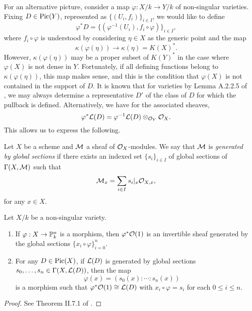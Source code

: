 For an alternative picture, consider a map $\varphi : X/k \to Y/k$ of non-singular varieties.
Fixing $D \in {\rm Pic}(Y)$, represented as $\{(U_i, f_i)\}_{i \in I}$,
we would like to define
\[
    \varphi^* D = \{(\varphi^{-1}(U_i), f_i \circ \varphi)\}_{i \in I},
\]
where $f_i \circ \varphi$ is understood by considering $\eta \in X$ as the generic point and the map
\[
    \kappa(\varphi(\eta)) \to \kappa(\eta) = K(X)^*.    
\]
However, $\kappa(\varphi(\eta))$ may be a proper subset of $K(Y)^*$ in the case where $\varphi(X)$ is not dense in $Y$.
Fortunately, if all defining functions belong to $\kappa(\varphi(\eta))$,
this map makes sense,
and this is the condition that $\varphi(X)$ is not contained in the support of $D$.
It is known that for varieties by Lemma A.2.2.5 of \cite{Silverman_Hindry_2013}, 
we may always determine a representative $D'$ of the class of $D$ for which the pullback is defined.
Alternatively, we have for the associated sheaves,
\[
    \varphi^* \mathcal{L}(D) = \varphi^{-1} \mathcal{L}(D) \otimes_{\mathcal{O}_Y} \mathcal{O}_X.
\]
This allows us to express the following.

\begin{definition}
    Let $X$ be a scheme and $\mathcal{M}$ a sheaf of $\mathcal{O}_X$-modules.
    We say that $\mathcal{M}$ is \textit{generated by global sections} if there exists an indexed set $\{s_i \}_{i \in I}$ of global sections of $\Gamma(X, \mathcal{M})$ such that 
    \[
        \mathcal{M}_x = \sum_{i \in I} s_i|_x \mathcal{O}_{X, x},
    \]
    for any $x \in X$.
\end{definition}

\begin{theorem}
    Let $X/k$ be a non-singular variety.
    \begin{enumerate}
        \item If $\varphi : X \to \mathbb{P}^n_k$ is a morphism,
        then $\varphi^*\mathcal{O}(1)$ is an invertible sheaf generated by the global sections $\{x_i \circ \varphi\}_{i = 0}^n$.
        \item For any $D \in {\rm Pic}(X)$, if $\mathcal{L}(D)$ is generated by global sections $s_0, \ldots, s_n \in \Gamma(X, \mathcal{L}(D))$,
        then the map
        \[
            \varphi(x) = (s_0(x) : \cdots : s_n(x))
        \]
        is a morphism such that $\varphi^* \mathcal{O}(1) \cong \mathcal{L}(D)$ with $x_i \circ \varphi = s_i$ for each $0 \leq i \leq n$.
    \end{enumerate}
\end{theorem}

\begin{proof}
    See Theorem II.7.1 of \cite{Hartshorne_2013}.
\end{proof}

